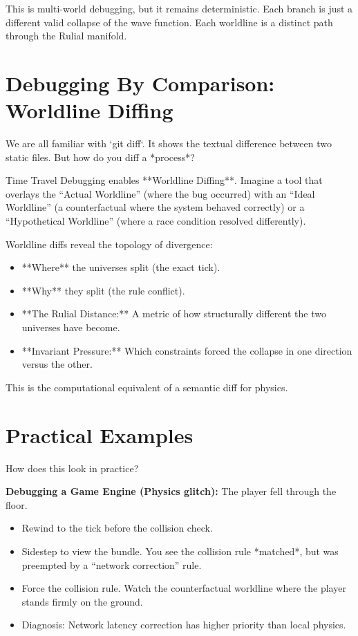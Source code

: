 This is multi-world debugging, but it remains deterministic. Each branch is just a different valid collapse of the wave function. Each worldline is a distinct path through the Rulial manifold.

\section{Debugging By Comparison: Worldline Diffing}

We are all familiar with `git diff`. It shows the textual difference between two static files. But how do you diff a *process*?

Time Travel Debugging enables **Worldline Diffing**. Imagine a tool that overlays the ``Actual Worldline'' (where the bug occurred) with an ``Ideal Worldline'' (a counterfactual where the system behaved correctly) or a ``Hypothetical Worldline'' (where a race condition resolved differently).

Worldline diffs reveal the topology of divergence:
\begin{itemize}
    \item **Where** the universes split (the exact tick).
    \item **Why** they split (the rule conflict).
    \item **The Rulial Distance:** A metric of how structurally different the two universes have become.
    \item **Invariant Pressure:** Which constraints forced the collapse in one direction versus the other.
\end{itemize}

This is the computational equivalent of a semantic diff for physics.

\section{Practical Examples}

How does this look in practice?

\textbf{Debugging a Game Engine (Physics glitch):}
The player fell through the floor.
\begin{itemize}
    \item Rewind to the tick before the collision check.
    \item Sidestep to view the bundle. You see the collision rule *matched*, but was preempted by a ``network correction'' rule.
    \item Force the collision rule. Watch the counterfactual worldline where the player stands firmly on the ground.
    \item Diagnosis: Network latency correction has higher priority than local physics.
\end{itemize}

